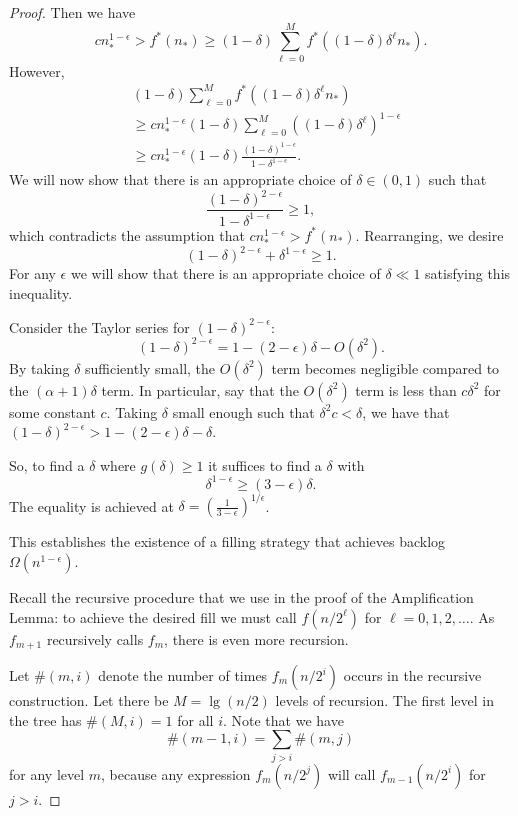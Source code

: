 \documentclass[twocolumn]{article}[11pt]
\renewcommand{\paragraph}[1]{\vspace{0.09in}\noindent{\bf \boldmath #1.}}
\begin{document}
\begin{proof}
  Then we have 
  $$cn_*^{1-\epsilon} > f^*(n_*) \ge (1-\delta)\sum_{\ell=0}^M f^*((1-\delta)\delta^\ell n_*).$$
  However, 
  \begin{align*}
  &(1-\delta)\sum_{\ell=0}^M f^*((1-\delta)\delta^\ell n_*) \\
  &\ge cn_*^{1-\epsilon}(1-\delta)\sum_{\ell=0}^M((1-\delta)\delta^\ell)^{1-\epsilon}\\
  &\ge cn_*^{1-\epsilon}(1-\delta) \frac{(1-\delta)^{1-\epsilon}}{1-\delta^{1-\epsilon}}.
  \end{align*}
  We will now show that there is an appropriate choice of $\delta \in (0,1)$
  such that $$\frac{(1-\delta)^{2-\epsilon}}{1-\delta^{1-\epsilon}} \ge 1,$$
  which contradicts the assumption that $c n_*^{1-\epsilon} > f^*(n_*)$.
  Rearranging, we desire $$(1-\delta)^{2-\epsilon} + \delta^{1-\epsilon}\ge 1.$$
  For any $\epsilon$ we will show that there is an appropriate choice of
  $\delta\ll 1$ satisfying this inequality.

  Consider the Taylor series for $(1-\delta)^{2-\epsilon}$:
  $$(1-\delta)^{2-\epsilon} = 1 - (2-\epsilon)\delta - O(\delta^2).$$
  By taking $\delta$ sufficiently small, the $O(\delta^2)$ term becomes
  negligible compared to the $(\alpha+1)\delta$ term. In particular, say that
  the $O(\delta^2)$ term is less than $c \delta^2$ for some constant $c$.
  Taking $\delta$ small enough such that $\delta^2 c < \delta$, we have that
  $(1-\delta)^{2-\epsilon} > 1-(2-\epsilon)\delta - \delta$.
 
  So, to find a $\delta$ where $g(\delta) \ge 1$ it suffices to find a $\delta$ with 
  $$\delta^{1-\epsilon} \ge (3-\epsilon)\delta.$$
  The equality is achieved at $\delta = (\frac{1}{3-\epsilon})^{1/\epsilon}$.

  This establishes the existence of a filling strategy that achieves backlog
  $\Omega(n^{1-\epsilon})$.

  \paragraph{Achieving backlog $\Omega(n^{\lg 3/2})$}
  Recall the recursive procedure that we use in the proof of the Amplification
  Lemma: to achieve the desired fill we must call $f(n/2^\ell)$ for
  $\ell = 0,1,2,\ldots$. As $f_{m+1}$ recursively calls $f_m$, there is even more recursion.

  Let $\#(m, i)$ denote the number of times ${f_m(n/2^i)}$ occurs
  in the recursive construction. Let there be $M = \lg (n/2)$  levels of
  recursion. The first level in the tree has $\#(M, i)=1$ for all $i$. Note
  that we have $$\#(m-1, i) = \sum_{j > i} \#(m, j)$$
  for any level $m$, because any expression $f_m(n/2^j)$ will
  call $f_{m-1}(n/2^i)$ for $j>i$.


\end{proof}
\end{document}

